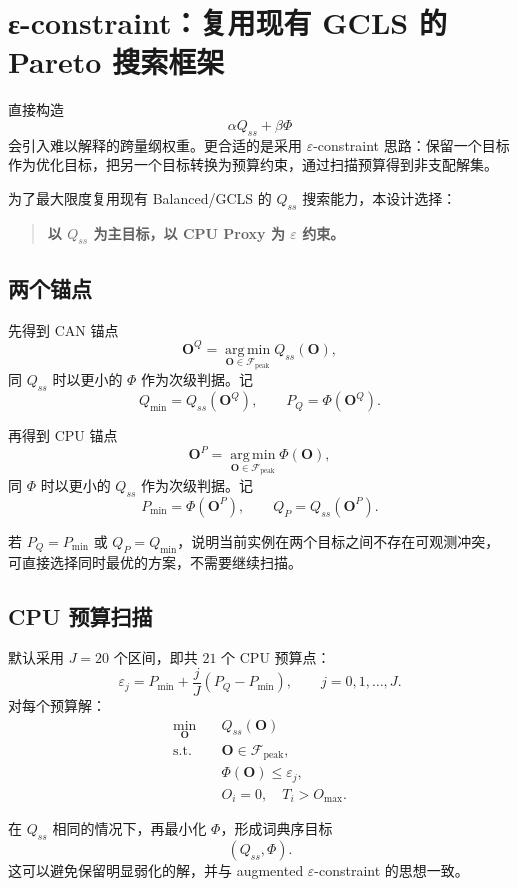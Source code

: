 \documentclass[11pt,a4paper,fontset=none]{ctexart}
\newcommand{\argmin}{\operatorname*{arg\,min}}
\newcommand{\Fpeak}{\mathcal{F}_{\mathrm{peak}}}
\begin{document}
\section{ε-constraint：复用现有 GCLS 的 Pareto 搜索框架}

直接构造
\[
\alpha Q_{ss}+\beta\Phi
\]
会引入难以解释的跨量纲权重。更合适的是采用 $\varepsilon$-constraint 思路：保留一个目标作为优化目标，把另一个目标转换为预算约束，通过扫描预算得到非支配解集\cite{mavrotas}。

为了最大限度复用现有 Balanced/GCLS 的 $Q_{ss}$ 搜索能力，本设计选择：
\begin{quote}
\textbf{以 $Q_{ss}$ 为主目标，以 CPU Proxy 为 $\varepsilon$ 约束。}
\end{quote}

\subsection{两个锚点}

先得到 CAN 锚点
\[
\mathbf O^{Q}
=\argmin_{\mathbf O\in\Fpeak}Q_{ss}(\mathbf O),
\tag{39}
\]
同 $Q_{ss}$ 时以更小的 $\Phi$ 作为次级判据。记
\[
Q_{\min}=Q_{ss}(\mathbf O^Q),
\qquad
P_Q=\Phi(\mathbf O^Q).
\tag{40}
\]

再得到 CPU 锚点
\[
\mathbf O^{P}
=\argmin_{\mathbf O\in\Fpeak}\Phi(\mathbf O),
\tag{41}
\]
同 $\Phi$ 时以更小的 $Q_{ss}$ 作为次级判据。记
\[
P_{\min}=\Phi(\mathbf O^P),
\qquad
Q_P=Q_{ss}(\mathbf O^P).
\tag{42}
\]

若 $P_Q=P_{\min}$ 或 $Q_P=Q_{\min}$，说明当前实例在两个目标之间不存在可观测冲突，可直接选择同时最优的方案，不需要继续扫描。

\subsection{CPU 预算扫描}

默认采用 $J=20$ 个区间，即共 $21$ 个 CPU 预算点：
\[
\varepsilon_j
=P_{\min}
+\frac{j}{J}(P_Q-P_{\min}),
\qquad
j=0,1,\ldots,J.
\tag{43}
\]
对每个预算解：
\[
\boxed{
\begin{aligned}
\min_{\mathbf O}\quad &Q_{ss}(\mathbf O)\\
\text{s.t.}\quad
&\mathbf O\in\Fpeak,\\
&\Phi(\mathbf O)\le\varepsilon_j,\\
&O_i=0,\quad T_i>O_{\max}.
\end{aligned}}
\tag{44}
\]

在 $Q_{ss}$ 相同的情况下，再最小化 $\Phi$，形成词典序目标
\[
(Q_{ss},\Phi).
\tag{45}
\]
这可以避免保留明显弱化的解，并与 augmented $\varepsilon$-constraint 的思想一致。
\end{document}

